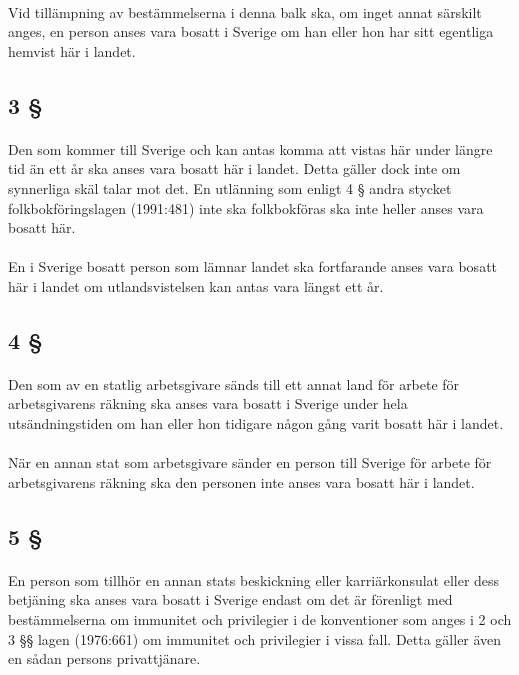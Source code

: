 \documentclass[a4paper,notitlepage,openany,10pt]{book}
\begin{document}
\paragraph*{}
Vid tillämpning av bestämmelserna i denna balk ska, om inget annat särskilt anges, en person anses vara bosatt i Sverige om han eller hon har sitt egentliga hemvist här i landet.
\subsection*{3 §}
\paragraph*{}
Den som kommer till Sverige och kan antas komma att vistas här under längre tid än ett år ska anses vara bosatt här i landet. Detta gäller dock inte om synnerliga skäl talar mot det. En utlänning som enligt 4 § andra stycket folkbokföringslagen (1991:481) inte ska folkbokföras ska inte heller anses vara bosatt här.
\paragraph*{}
En i Sverige bosatt person som lämnar landet ska fortfarande anses vara bosatt här i landet om utlandsvistelsen kan antas vara längst ett år.
\subsection*{4 §}
\paragraph*{}
Den som av en statlig arbetsgivare sänds till ett annat land för arbete för arbetsgivarens räkning ska anses vara bosatt i Sverige under hela utsändningstiden om han eller hon tidigare någon gång varit bosatt här i landet.
\paragraph*{}
När en annan stat som arbetsgivare sänder en person till Sverige för arbete för arbetsgivarens räkning ska den personen inte anses vara bosatt här i landet.
\subsection*{5 §}
\paragraph*{}
En person som tillhör en annan stats beskickning eller karriärkonsulat eller dess betjäning ska anses vara bosatt i Sverige endast om det är förenligt med bestämmelserna om immunitet och privilegier i de konventioner som anges i 2 och 3 §§ lagen (1976:661) om immunitet och privilegier i vissa fall. Detta gäller även en sådan persons privattjänare.
\end{document}
